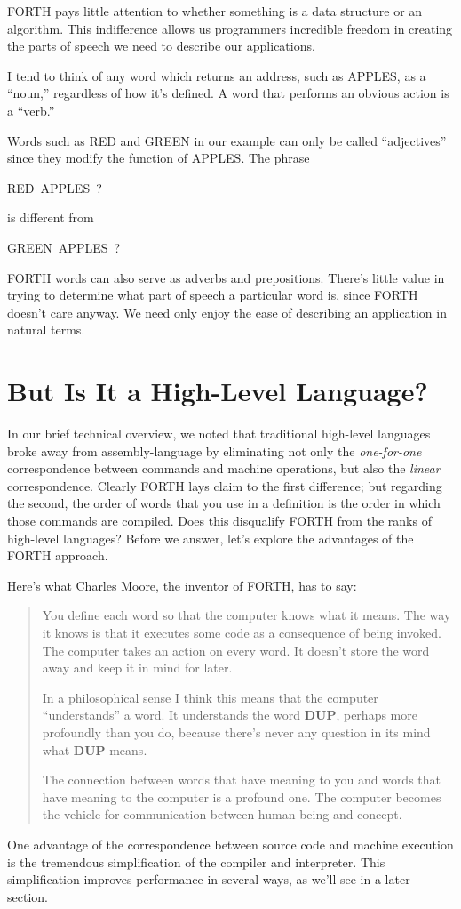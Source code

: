 FORTH pays little attention to whether something is a data structure
or an algorithm. This indifference allows us programmers incredible
freedom in creating the parts of speech we need to describe our applications.

I tend to think of any word which returns an address, such as APPLES,
as a {}``noun,'' regardless of how it's defined. A word that performs
an obvious action is a {}``verb.''

Words such as RED and GREEN in our example can only be called {}``adjectives''
since they modify the function of APPLES. The phrase

\begin{lyxcode}
RED~APPLES~?
\end{lyxcode}
is different from

\begin{lyxcode}
GREEN~APPLES~?
\end{lyxcode}
FORTH words can also serve as adverbs and prepositions. There's little
value in trying to determine what part of speech a particular word
is, since FORTH doesn't care anyway. We need only enjoy the ease of
describing an application in natural terms.


\section*{But Is It a High-Level Language?}

In our brief technical overview, we noted that traditional high-level
languages broke away from assembly-language by eliminating not only
the \emph{one-for-one} correspondence between commands and machine
operations, but also the \emph{linear} correspondence. Clearly FORTH
lays claim to the first difference; but regarding the second, the
order of words that you use in a definition is the order in which
those commands are compiled. Does this disqualify FORTH from the ranks
of high-level languages? Before we answer, let's explore the advantages
of the FORTH approach.

Here's what Charles Moore, the inventor of FORTH, has to say:

\begin{quote}
You define each word so that the computer knows what it means. The
way it knows is that it executes some code as a consequence of being
invoked. The computer takes an action on every word. It doesn't store
the word away and keep it in mind for later.

In a philosophical sense I think this means that the computer {}``understands''
a word. It understands the word \textbf{DUP}, perhaps more profoundly
than you do, because there's never any question in its mind what \textbf{DUP}
means.

The connection between words that have meaning to you and words that
have meaning to the computer is a profound one. The computer becomes
the vehicle for communication between human being and concept.
\end{quote}
One advantage of the correspondence between source code and machine
execution is the tremendous simplification of the compiler and interpreter.
This simplification improves performance in several ways, as we'll
see in a later section.

